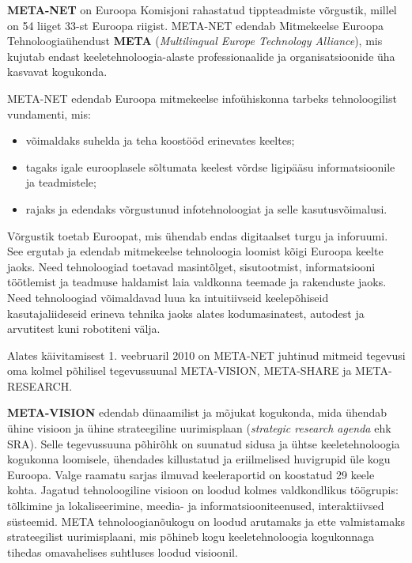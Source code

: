 \begin{multicols}{2}

\textbf{META-NET} on Euroopa Komisjoni rahastatud tippteadmiste võrgustik, millel on 54 liiget 33-st Euroopa riigist. 
META-NET edendab Mitmekeelse Euroopa Tehnoloogiaühendust \textbf{META} (\textit{Multilingual Europe Technology Alliance}), mis kujutab endast keeletehnoloogia-alaste professionaalide ja organisatsioonide üha kasvavat kogukonda.

META-NET edendab Euroopa mitmekeelse infoühiskonna tarbeks tehnoloogilist vundamenti, mis: 
\begin{itemize}
\item võimaldaks suhelda ja teha koostööd erinevates keeltes;
\item tagaks igale eurooplasele sõltumata keelest võrdse ligipääsu informatsioonile ja teadmistele;
\item rajaks ja edendaks võrgustunud infotehnoloogiat ja selle kasutusvõimalusi.
\end{itemize}

Võrgustik toetab Euroopat, mis ühendab endas digitaalset turgu ja inforuumi. See ergutab ja edendab mitmekeelse tehnoloogia loomist kõigi Euroopa keelte jaoks. 
Need tehnoloogiad toetavad masintõlget, sisutootmist, informatsiooni töötlemist ja teadmuse haldamist laia valdkonna teemade ja rakenduste jaoks. Need tehnoloogiad võimaldavad luua ka intuitiivseid keelepõhiseid kasutajaliideseid erineva tehnika jaoks alates kodumasinatest, autodest ja arvutitest kuni robotiteni välja.


Alates käivitamisest 1. veebruaril 2010 on META-NET juhtinud mitmeid tegevusi oma kolmel põhilisel tegevussuunal META-VISION, META-SHARE ja META-RESEARCH.

\textbf{META-VISION} edendab dünaamilist ja mõjukat kogukonda, mida ühendab ühine visioon ja ühine strateegiline uurimisplaan (\textit{strategic research agenda} ehk SRA). Selle tegevussuuna põhirõhk on suunatud sidusa ja ühtse keeletehnoloogia kogukonna loomisele, ühendades killustatud ja eriilmelised huvigrupid üle kogu Euroopa. 
Valge raamatu sarjas ilmuvad keeleraportid on koostatud 29 keele kohta. 
Jagatud tehnoloogiline visioon on loodud kolmes valdkondlikus töögrupis: tõlkimine ja lokaliseerimine, meedia- ja informatsiooniteenused, interaktiivsed süsteemid. 
META tehnoloogianõukogu on loodud arutamaks ja ette valmistamaks strateegilist uurimisplaani, mis põhineb kogu keeletehnoloogia kogukonnaga tihedas omavahelises suhtluses loodud visioonil.


\end{multicols}
